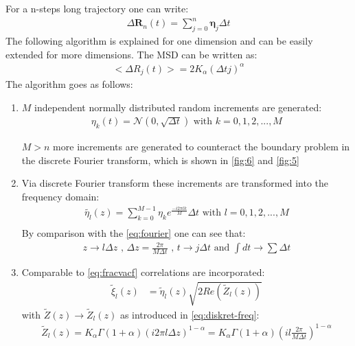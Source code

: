 \documentclass[
  a4paper,BCOR10mm,oneside,
  headsepline,footsepline,%
  fleqn,openbib
]{scrbook}
\begin{document}
For a n-steps long trajectory one can write:
\begin{align}
 \Delta \bm{R}_n(t) =  \sum_{j=0}^n \bm{\eta}_j  \Delta t \label{eq:diskretdeltar}
\end{align}
 The following algorithm is explained for one dimension and can be easily extended for more dimensions. The MSD can be written as:
\begin{align}
< \Delta R_{j}(t)>=2K_{\alpha} (\Delta t j)^{\alpha}
\end{align}
The algorithm goes as follows:
\begin{enumerate}
 \item $M$ independent normally distributed random increments are generated: 
\begin{align}
 \eta_k(t)= \mathcal{N}(0,\sqrt{\Delta t}) \text{  with  } k=0,1,2,...,M 
\end{align}

$M>n$  more increments are generated to counteract the boundary problem in the discrete Fourier transform, which is shown in \cref{fig:6} and \cref{fig:5}

\item Via discrete Fourier transform these increments are transformed into the frequency domain:
\begin{align}
 \tilde{\eta_l}(z)=\sum_{k=0}^{M-1} \eta_k e^{\frac{- i 2 \pi  l k }{M}} \Delta t   \text{  with  }  l=0,1,2,...,M  \label{eq:fouriertrans}\\ 
\end{align}
By comparison with the \cref{eq:fourier} one can see that:
\begin{align}
 z \rightarrow  l \Delta z \text{ , } \Delta z =   \frac{2 \pi }{M \Delta t} \text{ , } t \rightarrow j \Delta t \text{ and } \int dt \rightarrow \sum \Delta t \label{eq:diskret-freq} 
\end{align}
 
\item Comparable to \cref{eq:fracvacf} correlations are incorporated: 
 \begin{align}
   \tilde{\xi}_{l}(z)&= \tilde{\eta}_l(z) \sqrt{2 Re( \tilde{Z}_l(z))} \label{eq:problem} 
  \end{align}
 with $\tilde{Z}(z)\rightarrow \tilde{Z}_l(z)$ as introduced in \cref{eq:diskret-freq}:
  \begin{align}
   \tilde{Z}_l(z) = K_{\alpha} \Gamma(1+\alpha)(i 2 \pi l \Delta z)^{1-\alpha} =  K_{\alpha} \Gamma(1+\alpha)(i l \frac{ 2 \pi}{M \Delta t})^{1-\alpha} 
 \end{align}
 

\end{enumerate}
\end{document}
